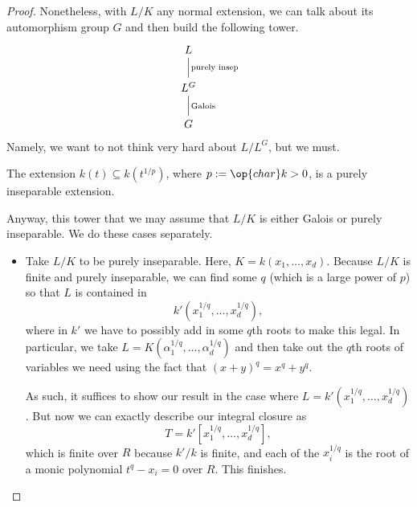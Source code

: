\begin{proof}
	Nonetheless, with $L/K$ any normal extension, we can talk about its automorphism group $G$ and then build the following tower.
	\[\begin{tikzcd}
		L \\
		{L^G} \\
		G
		\arrow["{\text{Galois}}"', no head, from=3-1, to=2-1]
		\arrow["{\text{purely insep}}"', no head, from=2-1, to=1-1]
	\end{tikzcd}\]
	Namely, we want to not think very hard about $L/L^G$, but we must.
	\begin{example}
		The extension $k(t)\subseteq k\left(t^{1/p}\right)$, where $p:=\op{char}k>0$, is a purely inseparable extension.
	\end{example}
	Anyway, this tower that we may assume that $L/K$ is either Galois or purely inseparable. We do these cases separately.
	\begin{itemize}
		\item Take $L/K$ to be purely inseparable. Here, $K=k(x_1,\ldots,x_d)$. Because $L/K$ is finite and purely inseparable, we can find some $q$ (which is a large power of $p$) so that $L$ is contained in
		\[k'\left(x_1^{1/q},\ldots,x_d^{1/q}\right),\]
		where in $k'$ we have to possibly add in some $q$th roots to make this legal. In particular, we take $L=K\left(\alpha_1^{1/q},\ldots,\alpha_d^{1/q}\right)$ and then take out the $q$th roots of variables we need using the fact that $(x+y)^q=x^q+y^q$.

		As such, it suffices to show our result in the case where $L=k'\left(x_1^{1/q},\ldots,x_d^{1/q}\right)$. But now we can exactly describe our integral closure as
		\[T=k'\left[x_1^{1/q},\ldots,x_d^{1/q}\right],\]
		which is finite over $R$ because $k'/k$ is finite, and each of the $x_i^{1/q}$ is the root of a monic polynomial $t^q-x_i=0$ over $R$. This finishes.


\end{itemize}
\end{proof}

